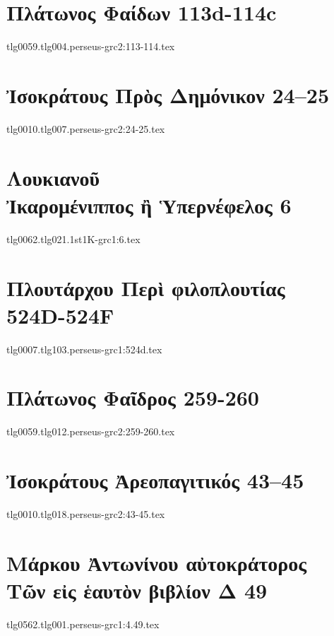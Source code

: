 \documentclass[a4paper,12pt,twoside]{report}
\begin{document}
\chapter[Πλάτωνος Φαίδων]{\textgreek[variant=ancient]{Πλάτωνος Φαίδων} 113d-114c}
{tlg0059.tlg004.perseus-grc2:113-114.tex}

\chapter[Ἰσοκράτους Πρὸς Δημόνικον]{\textgreek[variant=ancient]{Ἰσοκράτους Πρὸς Δημόνικον} 24–25}
{tlg0010.tlg007.perseus-grc2:24-25.tex}

\chapter[Λουκιανοῦ Ἰκαρομένιππος]{\textgreek[variant=ancient]{Λουκιανοῦ \\Ἰκαρομένιππος ἢ Ὑπερνέφελος} 6}
{tlg0062.tlg021.1st1K-grc1:6.tex}

\chapter[Πλουτάρχου Περὶ φιλοπλουτίας]{\textgreek[variant=ancient]{Πλουτάρχου Περὶ φιλοπλουτίας} \\524D-524F}
{tlg0007.tlg103.perseus-grc1:524d.tex}

\chapter[Πλάτωνος Φαῖδρος]{\textgreek[variant=ancient]{Πλάτωνος Φαῖδρος} 259-260}
{tlg0059.tlg012.perseus-grc2:259-260.tex}

\chapter[Ἰσοκράτους Ἀρεοπαγιτικός]{\textgreek[variant=ancient]{Ἰσοκράτους Ἀρεοπαγιτικός} 43–45}
{tlg0010.tlg018.perseus-grc2:43-45.tex}


\chapter[Μάρκου Ἀντωνίνου Τῶν εἰς ἑαυτὸν Δ 49]{\textgreek[variant=ancient]{Μάρκου Ἀντωνίνου αὐτοκράτορος \\Τῶν εἰς ἑαυτὸν βιβλίον Δ} 49}
{tlg0562.tlg001.perseus-grc1:4.49.tex}
\end{document}
